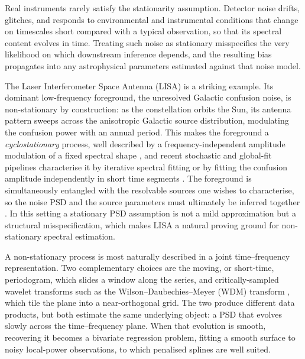 \documentclass[
  aps,
  prd,
  twocolumn,
  amsmath,
  amssymb,
  nofootinbib,
  superscriptaddress,
  longbibliography,
]{revtex4-2}
\begin{document}
Real instruments rarely satisfy the stationarity assumption. Detector noise
drifts, glitches, and responds to environmental and instrumental conditions that
change on timescales short compared with a typical observation, so that its
spectral content evolves in time. Treating such noise as stationary
misspecifies the very likelihood on which downstream inference depends, and the
resulting bias propagates into any astrophysical parameters estimated against
that noise model.

The Laser Interferometer Space Antenna (LISA) is a striking example. Its
dominant low-frequency foreground, the unresolved Galactic confusion noise, is
non-stationary by construction: as the constellation orbits the Sun, its
antenna pattern sweeps across the anisotropic Galactic source distribution,
modulating the confusion power with an annual period. This makes the foreground a
\emph{cyclostationary} process, well described by a frequency-independent
amplitude modulation of a fixed spectral shape
\citep{digman2022cyclostationary, buscicchio2024test}, and recent stochastic and
global-fit pipelines characterise it by iterative spectral fitting
\citep{karnesis2021characterization} or by fitting the confusion amplitude
independently in short time segments \citep{rosati2024prototype, pozzoli2024bahamas}. The
foreground is simultaneously entangled with the resolvable sources one wishes to
characterise, so the noise PSD and the source parameters must ultimately be
inferred together \citep{katz2025efficient}. In this setting a stationary PSD
assumption is not a mild approximation but a structural misspecification, which
makes LISA a natural proving ground for non-stationary spectral estimation.

A non-stationary process is most naturally described in a joint time--frequency
representation. Two complementary choices are the moving, or short-time,
periodogram, which slides a window along the series, and critically-sampled
wavelet transforms such as the Wilson--Daubechies--Meyer (WDM) transform
\citep{cornish2020Wavelets}, which tile the plane into a near-orthogonal grid.
The two produce different data products, but both estimate the same underlying
object: a PSD that evolves slowly across the time--frequency plane. When that
evolution is smooth, recovering it becomes a bivariate regression problem,
fitting a smooth surface to noisy local-power observations, to which penalised
splines are well suited.
\end{document}
